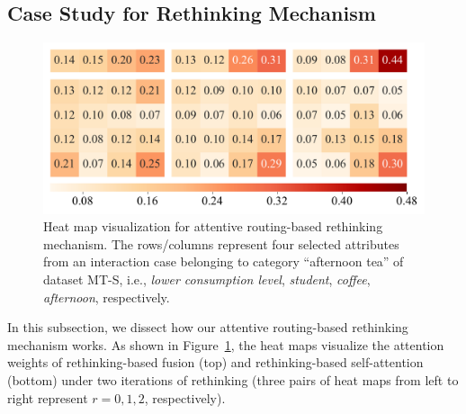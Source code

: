 \documentclass[11pt]{article}
\begin{document}
\subsection{Case Study for Rethinking Mechanism}
\begin{figure}
	\centering
	\includegraphics[width=0.99\linewidth]{submissions/HyCLID/figures/case_study.pdf}
	\caption{Heat map visualization for attentive routing-based rethinking mechanism. The rows/columns represent four selected attributes from an interaction case belonging to category ``afternoon tea'' of dataset MT-S, i.e., \textit{lower consumption level}, \textit{student}, \textit{coffee}, \textit{afternoon}, respectively. }
	\label{fig:case}
\end{figure}
In this subsection, we dissect how our attentive routing-based rethinking mechanism works. As shown in Figure~\ref{fig:case}, the heat maps visualize the attention weights of rethinking-based fusion (top) and rethinking-based self-attention (bottom) under two iterations of rethinking (three pairs of heat maps from left to right represent $ r=0, 1, 2 $, respectively).
\end{document}
